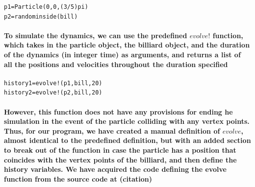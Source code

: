 \documentclass{report}
\begin{document}
\begin{lstlisting}
p1=Particle(0,0,(3/5)pi)
p2=randominside(bill)
\end{lstlisting}

\paragraph{To simulate the dynamics, we can use the predefined $evolve!$ function, which takes in the particle object, the billiard object, and the duration of the dynamics (in integer time) as arguments, and returns a list of all the positions and velocities throughout the duration specified}

\begin{lstlisting}
history1=evolve!(p1,bill,20)
history2=evolve!(p2,bill,20)
\end{lstlisting}


\paragraph{However, this function does not have any provisions for ending he simulation in the event of the particle colliding with any vertex points. Thus, for our program, we have created a manual definition of $evolve$, almost identical to the predefined definition, but with an added section to break out of the function in case the particle has a position that coincides with the vertex points of the billiard, and then define the history variables. We have acquired the code defining the evolve function from the source code at (citation)}
\end{document}
